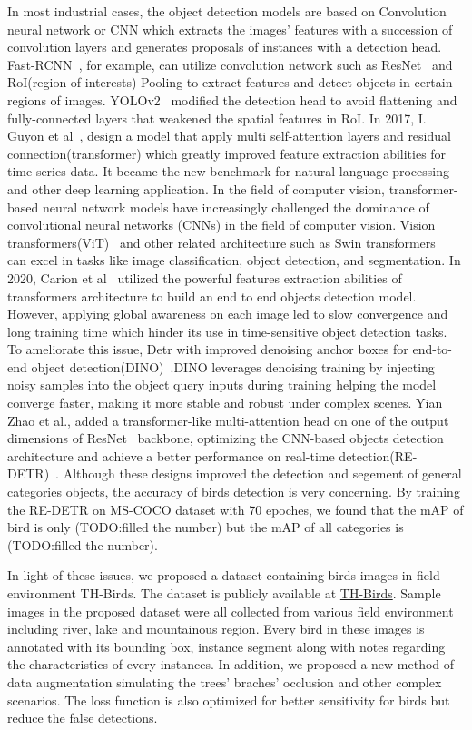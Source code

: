 In most industrial cases, the object detection models are based on Convolution neural network or CNN which extracts 
the images' features with a succession of convolution layers and generates proposals of instances with a detection head.
Fast-RCNN~\cite{fastrcnn}, for example, can utilize convolution network such as ResNet~\cite{resnet} and RoI(region of interests)
Pooling to extract features and detect objects in certain regions of images. YOLOv2~\cite{yolov2} modified the detection head 
to avoid flattening and fully-connected layers that weakened the spatial features in RoI.
In 2017, I. Guyon et al~\cite{transformer}, design a model that apply multi self-attention layers and residual connection(transformer)
which greatly improved feature extraction abilities for time-series data. It became the new benchmark for natural language processing
and other deep learning application. In the field of computer vision, 
transformer-based neural network models have increasingly challenged the dominance of convolutional neural networks (CNNs) 
in the field of computer vision. Vision transformers(ViT)~\cite{vit} and other related architecture such as Swin transformers~\cite{Swint}
can excel in tasks like image classification, object detection, and segmentation. In 2020, Carion et al~\cite{DETR} utilized 
the powerful features extraction abilities of transformers architecture to build an end to end objects detection model.
However, applying global awareness on each image led to slow convergence and long training time which hinder its use in time-sensitive object detection tasks.
To ameliorate this issue, Detr with improved denoising anchor boxes for end-to-end object detection(DINO)~\cite{dino}.DINO leverages denoising training by injecting noisy samples into the object query inputs during training
helping the model converge faster, making it more stable and robust under complex scenes.
Yian Zhao et al., added a transformer-like multi-attention head on one of the output dimensions of ResNet~\cite{resnet} backbone,
optimizing the CNN-based objects detection architecture and achieve a better performance on real-time detection(RE-DETR)~\cite{RTDETR}. Although 
these designs improved the detection and segement of general categories objects, the accuracy of birds detection 
is very concerning. By training the RE-DETR on MS-COCO dataset with 70 epoches, we found that the mAP of bird is only (TODO:filled the number)
but the mAP of all categories is (TODO:filled the number). 

In light of these issues, we proposed a dataset containing birds images in field environment TH-Birds. 
The dataset is publicly available at \href{https://github.com/TamakoHe/TH-Birds}{TH-Birds}. 
Sample images in the proposed dataset were all collected from various field environment including river, lake and mountainous region. Every bird in these images is annotated with its bounding box, instance segment along with notes
regarding the characteristics of every instances.  In addition, we proposed 
a new method of data augmentation simulating the trees' braches' occlusion 
and other complex scenarios. The loss function is also optimized for better sensitivity
for birds but reduce the false detections. 

